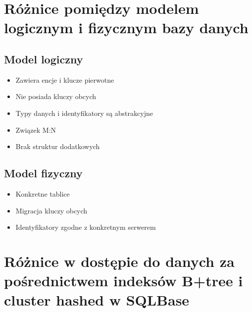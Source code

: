 \documentclass[a4paper,twoside]{article}
\begin{document}
  	\section*{Różnice pomiędzy modelem logicznym i fizycznym bazy danych}
  	\subsection*{Model logiczny}	%
  	\begin{itemize}
  		\item Zawiera encje i klucze pierwotne
  		\item Nie posiada kluczy obcych
  		\item Typy danych i identyfikatory są abstrakcyjne
  		\item Związek M:N
  		\item Brak struktur dodatkowych
  	\end{itemize}
  	\subsection*{Model fizyczny}	%
  	\begin{itemize}
  		\item Konkretne tablice
  		\item Migracja kluczy obcych
  		\item Identyfikatory zgodne z konkretnym serwerem
  	\end{itemize}
  	
  	\section*{Różnice w dostępie do danych za pośrednictwem indeksów B+tree i cluster hashed w SQLBase}
\end{document}
